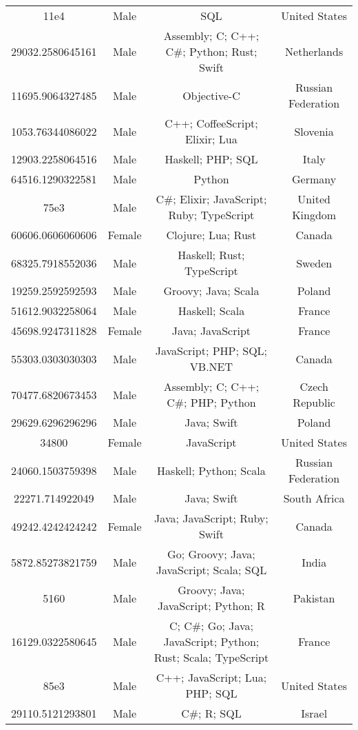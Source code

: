 \begin{center}
\begin{tabular}{ |c|c|c|c| }
11e4  &  Male  &  SQL  &  United States  \\ 
29032.2580645161  &  Male  &  Assembly; C; C++; C\#; Python; Rust; Swift  &  Netherlands  \\ 
11695.9064327485  &  Male  &  Objective-C  &  Russian Federation  \\ 
1053.76344086022  &  Male  &  C++; CoffeeScript; Elixir; Lua  &  Slovenia  \\ 
12903.2258064516  &  Male  &  Haskell; PHP; SQL  &  Italy  \\ 
64516.1290322581  &  Male  &  Python  &  Germany  \\ 
75e3  &  Male  &  C\#; Elixir; JavaScript; Ruby; TypeScript  &  United Kingdom  \\ 
60606.0606060606  &  Female  &  Clojure; Lua; Rust  &  Canada  \\ 
68325.7918552036  &  Male  &  Haskell; Rust; TypeScript  &  Sweden  \\ 
19259.2592592593  &  Male  &  Groovy; Java; Scala  &  Poland  \\ 
51612.9032258064  &  Male  &  Haskell; Scala  &  France  \\ 
45698.9247311828  &  Female  &  Java; JavaScript  &  France  \\ 
55303.0303030303  &  Male  &  JavaScript; PHP; SQL; VB.NET  &  Canada  \\ 
70477.6820673453  &  Male  &  Assembly; C; C++; C\#; PHP; Python  &  Czech Republic  \\ 
29629.6296296296  &  Male  &  Java; Swift  &  Poland  \\ 
34800  &  Female  &  JavaScript  &  United States  \\ 
24060.1503759398  &  Male  &  Haskell; Python; Scala  &  Russian Federation  \\ 
22271.714922049  &  Male  &  Java; Swift  &  South Africa  \\ 
49242.4242424242  &  Female  &  Java; JavaScript; Ruby; Swift  &  Canada  \\ 
5872.85273821759  &  Male  &  Go; Groovy; Java; JavaScript; Scala; SQL  &  India  \\ 
5160  &  Male  &  Groovy; Java; JavaScript; Python; R  &  Pakistan  \\ 
16129.0322580645  &  Male  &  C; C\#; Go; Java; JavaScript; Python; Rust; Scala; TypeScript  &  France  \\ 
85e3  &  Male  &  C++; JavaScript; Lua; PHP; SQL  &  United States  \\ 
29110.5121293801  &  Male  &  C\#; R; SQL  &  Israel  \\ 

\end{tabular}
\end{center}
